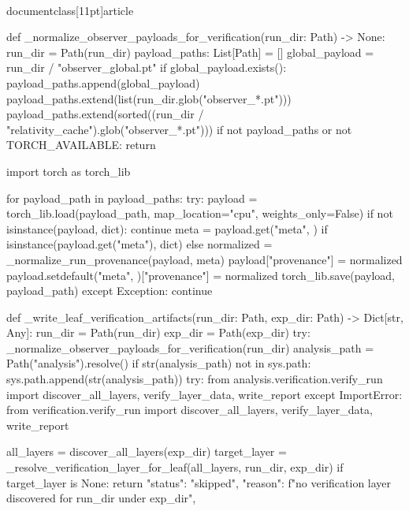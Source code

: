 \\documentclass[11pt]{article}
\begin{document}
\begin{CodeBlock}
def _normalize_observer_payloads_for_verification(run_dir: Path) -> None:
    run_dir = Path(run_dir)
    payload_paths: List[Path] = []
    global_payload = run_dir / "observer_global.pt"
    if global_payload.exists():
        payload_paths.append(global_payload)
    payload_paths.extend(list(run_dir.glob("observer_*.pt")))
    payload_paths.extend(sorted((run_dir / "relativity_cache").glob("observer_*.pt")))
    if not payload_paths or not TORCH_AVAILABLE:
        return

    import torch as torch_lib

    for payload_path in payload_paths:
        try:
            payload = torch_lib.load(payload_path, map_location="cpu", weights_only=False)
            if not isinstance(payload, dict):
                continue
            meta = payload.get("meta", {}) if isinstance(payload.get("meta"), dict) else {}
            normalized = _normalize_run_provenance(payload, meta)
            payload["provenance"] = normalized
            payload.setdefault("meta", {})["provenance"] = normalized
            torch_lib.save(payload, payload_path)
        except Exception:
            continue


def _write_leaf_verification_artifacts(run_dir: Path, exp_dir: Path) -> Dict[str, Any]:
    run_dir = Path(run_dir)
    exp_dir = Path(exp_dir)
    try:
        _normalize_observer_payloads_for_verification(run_dir)
        analysis_path = Path("analysis").resolve()
        if str(analysis_path) not in sys.path:
            sys.path.append(str(analysis_path))
        try:
            from analysis.verification.verify_run import discover_all_layers, verify_layer_data, write_report
        except ImportError:
            from verification.verify_run import discover_all_layers, verify_layer_data, write_report

        all_layers = discover_all_layers(exp_dir)
        target_layer = _resolve_verification_layer_for_leaf(all_layers, run_dir, exp_dir)
        if target_layer is None:
            return {
                "status": "skipped",
                "reason": f"no verification layer discovered for {run_dir} under {exp_dir}",
            }


\end{CodeBlock}
\end{document}
